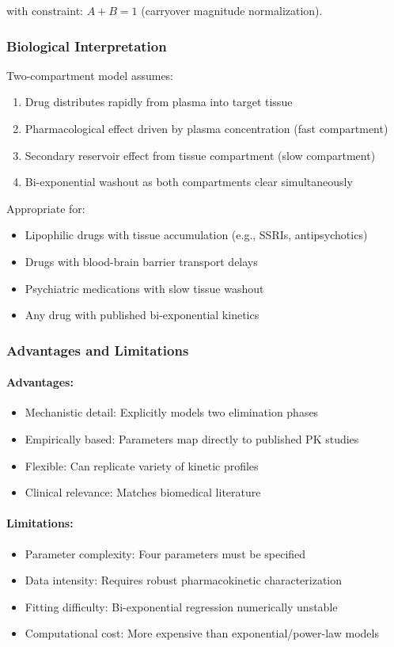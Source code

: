 \documentclass[11pt,a4paper]{article}
\begin{document}
with constraint: $A + B = 1$ (carryover magnitude normalization).

\subsubsection{Biological Interpretation}

Two-compartment model assumes:
\begin{enumerate}
  \item Drug distributes rapidly from plasma into target tissue
  \item Pharmacological effect driven by plasma concentration (fast compartment)
  \item Secondary reservoir effect from tissue compartment (slow compartment)
  \item Bi-exponential washout as both compartments clear simultaneously
\end{enumerate}

Appropriate for:
\begin{itemize}
  \item Lipophilic drugs with tissue accumulation (e.g., SSRIs, antipsychotics)
  \item Drugs with blood-brain barrier transport delays
  \item Psychiatric medications with slow tissue washout
  \item Any drug with published bi-exponential kinetics
\end{itemize}

\subsubsection{Advantages and Limitations}

\paragraph{Advantages:}
\begin{itemize}
  \item Mechanistic detail: Explicitly models two elimination phases
  \item Empirically based: Parameters map directly to published PK studies
  \item Flexible: Can replicate variety of kinetic profiles
  \item Clinical relevance: Matches biomedical literature
\end{itemize}

\paragraph{Limitations:}
\begin{itemize}
  \item Parameter complexity: Four parameters must be specified
  \item Data intensity: Requires robust pharmacokinetic characterization
  \item Fitting difficulty: Bi-exponential regression numerically unstable
  \item Computational cost: More expensive than exponential/power-law models
\end{itemize}
\end{document}
